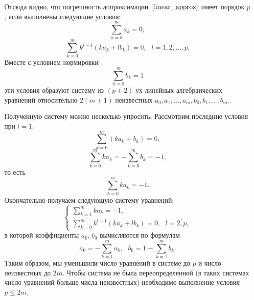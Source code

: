 \documentclass[11pt,a4paper,twoside,listtotoc,bibtotoc]{report}
\numberwithin{equation}{section}
\theoremstyle{definition}
\theoremstyle{plain}
\begin{document}
Отсюда видно, что погрешность аппроксимации~$\eqref{linear_approx}$ имеет
порядок $p$, если выполнены следующие условия:
%
$$
    \sum_{k=0}^{m}a_k=0,
$$
%
$$
    \sum_{k=0}^m k^{l-1}(ka_k+lb_k)=0,~~~l=1,2,\ldots,p.
$$
%
Вместе с условием нормировки
%
$$
    \sum_{k=0}^m b_k=1
$$
%
эти условия образуют систему из $(p+2)$-ух линейных алгебраических уравнений относительно
$2(m+1)$ неизвестных $a_0,a_1,\ldots,a_m,b_0,b_1,\ldots,b_m$.

Полученную систему можно несколько упросить. Рассмотрим последние условия при $l=1$:
%
$$
    \sum\limits_{k=0}^m (ka_k+b_k)=0,
$$
%
$$
    \sum\limits_{k=0}^m ka_k = -\sum_{k=0}^m b_k = -1,
$$
%
то есть
%
$$
    \sum\limits_{k=0}^m ka_k = -1.
$$
%
Окончательно получаем следующую систему уравнений:
%
\begin{equation}
    \label{multi_step_res_system}
    \begin{cases}
        \sum\limits_{k=1}^m ka_k = -1, \\
        \sum\limits_{k=0}^m k^{l-1}(ka_k+lb_k)=0,~~~l=\overline{2,p},
    \end{cases}
\end{equation}
в которой коэффициенты $a_0$, $b_0$ вычисляются по формулам
%
$$
    a_0 = -\sum_{k=1}^ma_k, ~~~b_0 = 1-\sum_{k=1}^mb_k.
$$
%
Таким образом, мы уменьшили число уравнений в системе до $p$ и
число неизвестных до $2m$. Чтобы система не была переопределенной
(в таких системах число уравнений больше числа неизвестных)
необходимо выполнение условия $p \leqslant 2m$.
\end{document}
